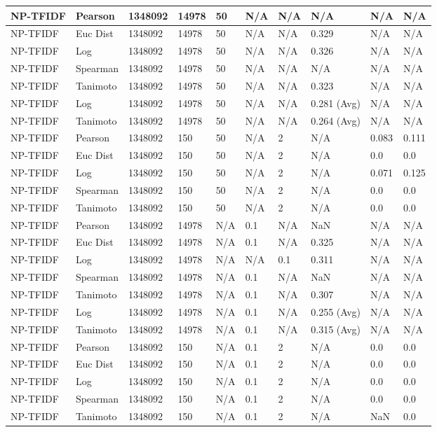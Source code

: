 \documentclass{article}
\begin{document}
\begin{longtable}{ |p{1.7cm}|p{1.9cm}|p{1.5cm}|p{1.5cm}|p{0.75cm}|p{0.75cm}|p{0.75cm}|p{0.75cm}|p{1.5cm}|p{1.5cm}|}
    NP-TFIDF & Pearson & 1348092 & 14978 & 50 & N/A & N/A & N/A & N/A & N/A  \\ \hline
    NP-TFIDF  & Euc Dist & 1348092 & 14978 & 50 & N/A & N/A & 0.329 & N/A & N/A   \\ \hline
    NP-TFIDF  & Log & 1348092 & 14978 &  50 & N/A & N/A & 0.326 & N/A & N/A  \\ \hline
    NP-TFIDF  & Spearman & 1348092 & 14978 & 50 & N/A & N/A & N/A & N/A & N/A \\ \hline
    NP-TFIDF  & Tanimoto & 1348092 & 14978 & 50 & N/A& N/A & 0.323 & N/A & N/A \\ \hline
    NP-TFIDF  & Log & 1348092 & 14978 & 50 & N/A& N/A & 0.281 (Avg) & N/A & N/A \\ \hline
    NP-TFIDF  & Tanimoto & 1348092 & 14978 & 50 & N/A & N/A & 0.264 (Avg) & N/A & N/A \\ \hline
    
    NP-TFIDF  & Pearson & 1348092 & 150 & 50 & N/A  & 2 & N/A & 0.083 & 0.111  \\ \hline
    NP-TFIDF  & Euc Dist & 1348092 & 150 & 50 & N/A  & 2 & N/A &0.0 & 0.0   \\ \hline
    NP-TFIDF  & Log & 1348092 & 150 & 50 & N/A & 2 & N/A & 0.071 & 0.125  \\ \hline
    NP-TFIDF  & Spearman & 1348092 & 150 & 50 & N/A  & 2 & N/A &0.0 & 0.0 \\ \hline
    NP-TFIDF  & Tanimoto & 1348092 & 150 & 50 & N/A  & 2 & N/A & 0.0 & 0.0 \\ \hline
    
    NP-TFIDF & Pearson & 1348092 & 14978 & N/A & 0.1 & N/A & NaN & N/A & N/A  \\ \hline
    NP-TFIDF  & Euc Dist & 1348092 & 14978 & N/A & 0.1 & N/A & 0.325 & N/A & N/A   \\ \hline
    NP-TFIDF  & Log & 1348092 & 14978 & N/A &  N/A & 0.1 & 0.311 & N/A & N/A  \\ \hline
    NP-TFIDF  & Spearman & 1348092 & 14978 & N/A & 0.1 & N/A & NaN & N/A & N/A \\ \hline
    NP-TFIDF  & Tanimoto & 1348092 & 14978 & N/A & 0.1 & N/A & 0.307 & N/A & N/A \\ \hline
    NP-TFIDF  & Log & 1348092 & 14978 & N/A & 0.1 & N/A & 0.255 (Avg) & N/A & N/A \\ \hline
    NP-TFIDF  & Tanimoto & 1348092 & 14978 & N/A & 0.1 & N/A & 0.315 (Avg) & N/A & N/A \\ \hline
    
    NP-TFIDF  & Pearson & 1348092 & 150 & N/A & 0.1 & 2 & N/A & 0.0 & 0.0  \\ \hline
    NP-TFIDF  & Euc Dist & 1348092 & 150 & N/A & 0.1 & 2 & N/A &0.0 & 0.0   \\ \hline
    NP-TFIDF  & Log & 1348092 & 150 & N/A & 0.1 & 2 & N/A & 0.0 & 0.0  \\ \hline
    NP-TFIDF  & Spearman & 1348092 & 150 & N/A & 0.1 & 2 & N/A &0.0 & 0.0 \\ \hline
    NP-TFIDF  & Tanimoto & 1348092 & 150 & N/A & 0.1 & 2 & N/A & NaN & 0.0 \\ \hline
    

\end{longtable}
\end{document}
